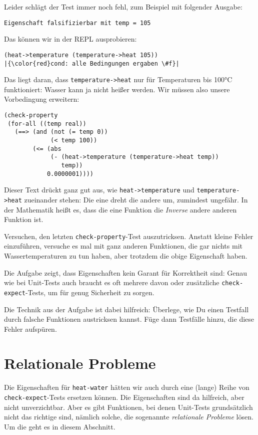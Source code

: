Leider schlägt der Test immer noch fehl, zum Beispiel mit folgender
Ausgabe:
%
\begin{lstlisting}
Eigenschaft falsifizierbar mit temp = 105
\end{lstlisting}
%
Das können wir in der REPL ausprobieren:
%
\begin{lstlisting}
(heat->temperature (temperature->heat 105))
|{\color{red}cond: alle Bedingungen ergaben \#f}|
\end{lstlisting}
%
Das liegt daran, dass \lstinline{temperature->heat} nur für
Temperaturen bis 100\si{\degree}C funktioniert: Wasser kann ja nicht
heißer werden.  Wir müssen also unsere Vorbedingung erweitern:
%
\begin{lstlisting}
(check-property
 (for-all ((temp real))
   (==> (and (not (= temp 0))
             (< temp 100))
        (<= (abs
             (- (heat->temperature (temperature->heat temp))
                temp))
            0.0000001))))
\end{lstlisting}
%
Dieser Text drückt ganz gut aus, wie \lstinline{heat->temperature} und
\lstinline{temperature->heat} zueinander stehen: Die eine dreht die
andere um, zumindest ungefähr.  In der Mathematik heißt es, dass die
eine Funktion die \textit{Inverse} andere anderen Funktion
ist.

\begin{aufgabeinline}
  Versuchen, den letzten \lstinline{check-property}-Test
  auszutricksen.  Anstatt kleine Fehler einzuführen, versuche es mal
  mit ganz anderen Funktionen, die gar nichts mit Wassertemperaturen
  zu tun haben, aber trotzdem die obige Eigenschaft haben.
\end{aufgabeinline}
%
Die Aufgabe zeigt, dass Eigenschaften kein Garant für Korrektheit
sind: Genau wie bei Unit-Tests auch braucht es oft mehrere davon oder
zusätzliche \lstinline{check-expect}-Tests, um für genug Sicherheit zu
sorgen.

Die Technik aus der Aufgabe ist dabei hilfreich: Überlege, wie Du
einen Testfall durch falsche Funktionen austricksen kannst.  Füge dann
Testfälle hinzu, die diese Fehler aufspüren.



\section{Relationale Probleme}

Die Eigenschaften für \lstinline{heat-water} hätten wir auch durch
eine (lange) Reihe von \lstinline{check-expect}-Tests ersetzen können.
Die Eigenschaften sind da hilfreich, aber nicht unverzichtbar.  Aber
es gibt Funktionen, bei denen Unit-Tests grundsätzlich nicht das
richtige sind, nämlich solche, die sogenannte \textit{relationale
  Probleme} lösen.  Um die geht es in diesem Abschnitt.

